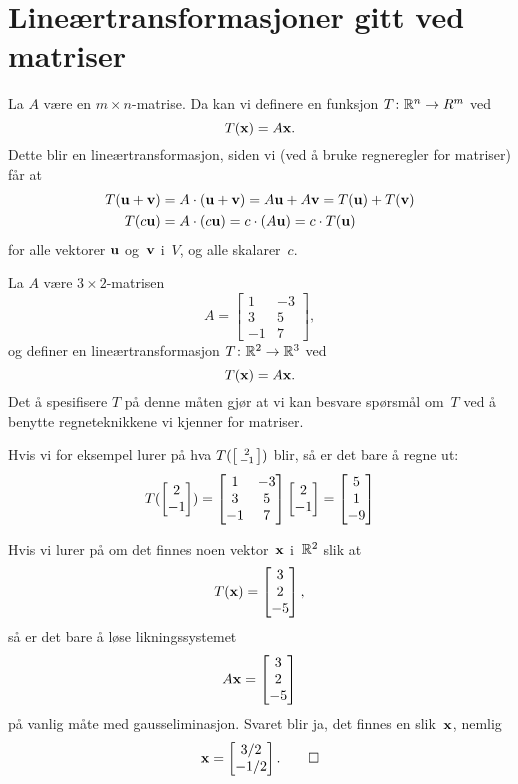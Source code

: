 




\section*{Lineærtransformasjoner gitt ved matriser}

La $A$ være en $m \times n$-matrise.  Da kan vi definere en funksjon
$T \colon \mathbb{R}^n \to R^m$ ved
\[
T(\mathbf{x}) = A \mathbf{x}.
\]
Dette blir en lineærtransformasjon, siden vi (ved å bruke regneregler
for matriser) får at
\begin{align*}
T(\mathbf{u} + \mathbf{v}) &= A \cdot (\mathbf{u} + \mathbf{v}) = A\mathbf{u} + A\mathbf{v} = T(\mathbf{u}) + T(\mathbf{v}) \\
T(c\mathbf{u}) &= A \cdot (c\mathbf{u}) = c \cdot (A\mathbf{u}) = c \cdot T(\mathbf{u})
\end{align*}
for alle vektorer $\mathbf{u}$ og~$\mathbf{v}$ i~$V$, og alle skalarer~$c$.

\begin{ex}
La $A$ være $3 \times 2$-matrisen
\[
A =
\begin{bmatrix}
1 & -3 \\
3 & 5 \\
-1 & 7
\end{bmatrix},
\]
og definer en lineærtransformasjon $T \colon \mathbb{R}^2 \to \mathbb{R}^3$ ved
\[
T(\mathbf{x}) = A \mathbf{x}.
\]
Det å spesifisere $T$ på denne måten gjør at vi kan besvare spørsmål
om~$T$ ved å benytte regneteknikkene vi kjenner for matriser.

Hvis vi for eksempel lurer på hva $T(\left[ \begin{smallmatrix} 2 \\ -1 \end{smallmatrix} \right])$ blir, så er det
bare å regne ut:
\[
T(\begin{bmatrix} 2 \\ -1 \end{bmatrix})
 =
\begin{bmatrix}
1 & -3 \\
3 & 5 \\
-1 & 7
\end{bmatrix}
\begin{bmatrix} 2 \\ -1 \end{bmatrix}
 = \begin{bmatrix} 5 \\ 1 \\ -9 \end{bmatrix}
\]

Hvis vi lurer på om det finnes noen vektor~$\mathbf{x}$ i~$\mathbb{R}^2$ slik at
\[
T(\mathbf{x}) = \begin{bmatrix} 3 \\ 2 \\ -5 \end{bmatrix},
\]
så er det bare å løse likningssystemet
\[
A\mathbf{x} = \begin{bmatrix} 3 \\ 2 \\ -5 \end{bmatrix}
\]
på vanlig måte med gausseliminasjon.  Svaret blir ja, det finnes en
slik~$\mathbf{x}$, nemlig
\[
\mathbf{x} = \begin{bmatrix} 3/2 \\ -1/2 \end{bmatrix}.
\qedhere
\]
\end{ex}

